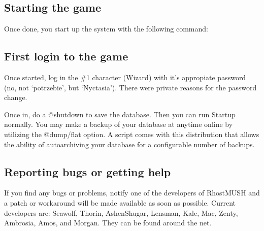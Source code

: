 \documentclass[letterpaper,10pt,english]{sphinxmanual}
\begin{document}
\subsection{Starting the game}
\label{\detokenize{installation:starting-the-game}}
\sphinxAtStartPar
Once done, you start up the system with the following command:

\begin{sphinxVerbatim}[commandchars=\\\{\}]
  \PYG{p}{[}\PYG{p}{]} 

           

      

   \PYG{p}{[}\PYG{p}{]}      
   \PYG{p}{[}\PYG{p}{]}        
\end{sphinxVerbatim}


\subsection{First login to the game}
\label{\detokenize{installation:first-login-to-the-game}}
\sphinxAtStartPar
Once started, log in the \#1 character (Wizard) with it’s appropiate
password (no, not ‘potrzebie’, but ‘Nyctasia’).  There were private
reasons for the password change.

\sphinxAtStartPar
Once in, do a @shutdown to save the database.  Then you can run Startup
normally.   You may make a backup of your database at anytime on\sphinxhyphen{}line by
utilizing the @dump/flat option.  A script comes with this distribution
that allows the ability of auto\sphinxhyphen{}archiving your database for a configurable
number of backups.


\subsection{Reporting bugs or getting help}
\label{\detokenize{installation:reporting-bugs-or-getting-help}}
\sphinxAtStartPar
If you find any bugs or problems, notify one of the developers of RhostMUSH and
a patch or workaround will be made available as soon as possible.  Current
developers are:  Seawolf, Thorin, Ashen\sphinxhyphen{}Shugar, Lensman, Kale, Mac, Zenty,
Ambrosia, Amos, and Morgan.  They can be found around the net.
\end{document}
